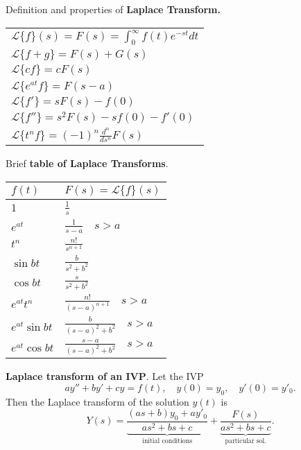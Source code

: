 \documentclass[11pt]{article}
\begin{document}
\begin{preamble}
 
\begin{formulaitem}
\item Definition and properties of \textbf{Laplace Transform. }
\renewcommand{\arraystretch}{1.5}
\setlength{\tabcolsep}{10pt}
\begin{center}
\begin{tabular}{|l|}
\hline
$\mathcal{L}\{f\}(s)=F(s)=\int_{0}^{\infty}f(t)e^{-st}dt$\\
$\mathcal{L}\{f+g\}=F(s)+G(s)$ \\
$\mathcal{L}\{cf\}=cF(s)$ \\
$\mathcal{L}\{e^{at}f\}=F(s-a)$ \\
$\mathcal{L}\{f'\}=sF(s)-f(0)$ \\
$\mathcal{L}\{f''\}=s^{2}F(s)-sf(0)-f'(0)$ \\
$\mathcal{L}\{t^{n}f\}=(-1)^{n}\frac{d^{n}}{ds^{n}}F(s)$ \\ 
\hline
\end{tabular}
\end{center}

\item Brief \textbf{table of Laplace Transforms}.
\renewcommand{\arraystretch}{1.5}
\setlength{\tabcolsep}{10pt}
\begin{center}
\begin{tabular}{|ll|}
\hline
$f(t)$ & $F(s)=\mathcal{L}\{f\}(s)$ \\
\hline
$1$ & $\frac{1}{s}$ \\
$e^{at}$ & $\frac{1}{s-a} \quad s>a$\\
$t^{n}$ & $\frac{n!}{s^{n+1}}$ \\
$\sin bt$ & $\frac{b}{s^{2}+b^{2}}$ \\
$\cos bt$ & $\frac{s}{s^{2}+b^{2}}$ \\
$e^{at}t^{n}$ & $\frac{n!}{(s-a)^{n+1}} \quad s>a$ \\
$e^{at}\sin bt$ & $\frac{b}{(s-a)^{2}+b^{2}} \quad s>a$ \\
$e^{at}\cos bt$ & $\frac{s-a}{(s-a)^{2}+b^{2}} \quad s>a$ \\
\hline 
\end{tabular}
\end{center}

\item \textbf{Laplace transform of an IVP}. Let the IVP
\[ay''+by' +cy = f(t),\quad y(0)=y_{0}, \quad y'(0)=y'_{0}.\]
Then the Laplace transform of the solution $y(t)$ is
\[Y(s)= \underbrace{\frac{(as+b)y_{0}+ay'_{0}}{as^{2}+bs+c}}_{\text{initial conditions}}+\underbrace{\frac{F(s)}{as^{2}+bs+c}}_{\text{particular sol.}}.\]

\end{formulaitem}


\end{preamble}
\end{document}
